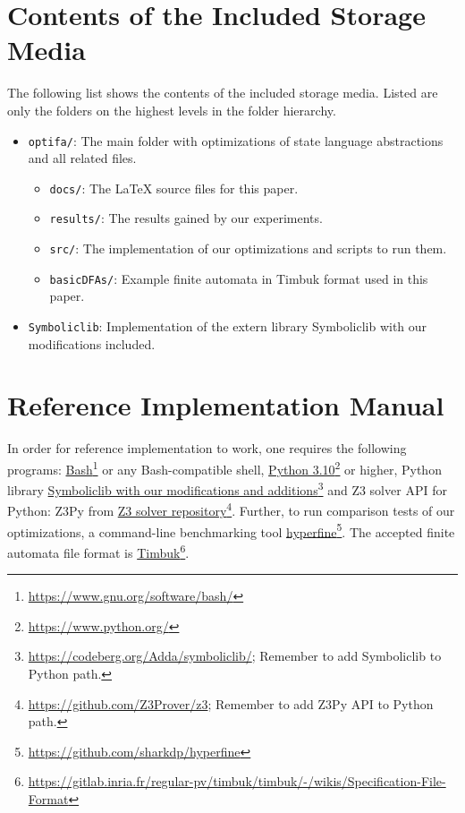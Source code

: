
\chapter{Contents of the Included Storage Media}

The following list shows the contents of the included storage media. Listed are only the folders on the highest levels in the folder hierarchy.

\begin{itemize}
    \item \texttt{optifa/}: The main folder with optimizations of state language abstractions and all related files.
    \begin{itemize}
        \item \texttt{docs/}: The LaTeX source files for this paper.
        \item \texttt{results/}: The results gained by our experiments.
        \item \texttt{src/}: The implementation of our optimizations and scripts to run them.
        \item \texttt{basicDFAs/}: Example finite automata in Timbuk format used in this paper.
    \end{itemize}

    \item \texttt{Symboliclib}: Implementation of the extern library Symboliclib with our modifications included.

\end{itemize}


\chapter{Reference Implementation Manual}

In order for reference implementation to work, one requires the following programs: \href{https://www.gnu.org/software/bash/}{Bash}\footnote{\url{https://www.gnu.org/software/bash/}} or any Bash-compatible shell, \href{https://www.python.org/}{Python 3.10}\footnote{\url{https://www.python.org/}} or higher, Python library \href{https://codeberg.org/Adda/symboliclib/}{Symboliclib with our modifications and additions}\footnote{\url{https://codeberg.org/Adda/symboliclib/}; Remember to add Symboliclib to Python path.} and Z3 solver API for Python: Z3Py from \href{https://github.com/Z3Prover/z3}{Z3 solver repository}\footnote{\url{https://github.com/Z3Prover/z3}; Remember to add Z3Py API to Python path.}. Further, to run comparison tests of our optimizations, a command-line benchmarking tool \href{https://github.com/sharkdp/hyperfine}{hyperfine}\footnote{\url{https://github.com/sharkdp/hyperfine}}. The accepted finite automata file format is \href{https://gitlab.inria.fr/regular-pv/timbuk/timbuk/-/wikis/Specification-File-Format}{Timbuk}\footnote{\url{https://gitlab.inria.fr/regular-pv/timbuk/timbuk/-/wikis/Specification-File-Format}}.

